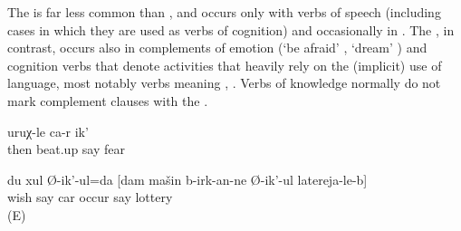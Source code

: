 The   is far less common than , and occurs only with verbs of speech (including cases in which they are used as verbs of cognition) and occasionally in  . The  , in contrast, occurs also in complements of emotion (`be afraid' , `dream' ) and cognition verbs that denote activities that heavily rely on the (implicit) use of language, most notably verbs meaning  , . Verbs of knowledge normally do not mark complement clauses with the  .
%
\begin{exe}
	\ex	\label{ex:She is afraid that he will then beat her up}
	\gll	[c'il	ca-r	it-an=da	r-ik'-ul]	uruχ-le	ca-r	ik'\\
		then		beat.up	say	fear		\\
	\glt	{}

	\ex	\label{ex:I dream to win a car in the lottery}
	\gll	du xul Ø-ik'-ul=da [dam mašin b-irk-an-ne Ø-ik'-ul latereja-le-b]\\
		 wish	say		car	occur say lottery\\
	\glt	{} (E)
\end{exe}

